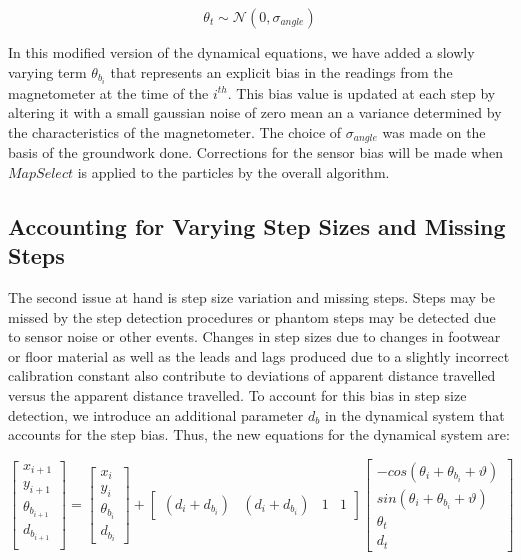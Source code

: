 \documentclass[10pt,journal,letterpaper,compsoc]{IEEEtran}
\begin{document}
\begin{equation}
\theta_t \sim \mathcal{N}(0,\sigma_{angle})
\end{equation}

In this modified version of the dynamical equations, we have added a slowly
varying term $\theta_{b_i}$ that represents an explicit bias in the readings
from the magnetometer at the time of the $i^{th}$. This bias value is updated at
each step by altering it with a small gaussian noise of zero mean an a variance
determined by the characteristics of the magnetometer. The choice of
$\sigma_{angle}$ was made on the basis of the groundwork done. Corrections
for the sensor bias will be made when $MapSelect$ is applied to the particles by
the overall algorithm.

\subsection{Accounting for Varying Step Sizes and Missing Steps\label{sec:step_bias}}

The second issue at hand is step size variation and missing steps. Steps may
be missed by the step detection procedures or phantom steps may be detected
due to sensor noise or other events. Changes in step sizes due to changes in 
footwear or floor material as well as the leads and lags produced due to a 
slightly incorrect calibration constant also contribute to deviations of 
apparent distance travelled versus the apparent distance travelled. To account
for this bias in step size detection, we introduce an additional parameter
$d_{b}$ in the dynamical system that accounts for the step bias. 
Thus, the new equations for the dynamical system are:

\begin{equation}
\begin{bmatrix}x_{i+1}\\
y_{i+1}\\
\theta_{b_{i+1}}\\
d_{b_{i+1}}\\
\end{bmatrix} = \begin{bmatrix}x_{i}\\
y_{i}\\
\theta_{b_i}\\
d_{b_i}
\end{bmatrix}  + \begin{bmatrix}(d{}_{i}+d_{b_i}) & (d{}_{i}+d_{b_i}) & 1 & 1\end{bmatrix} \begin{bmatrix}-cos(\theta_{i}+\theta_{b_i}+\vartheta)\\
sin(\theta_{i}+\theta_{b_i}+\vartheta)\\
\theta_t\\
d_{t}
\end{bmatrix} 
\end{equation}
\end{document}
